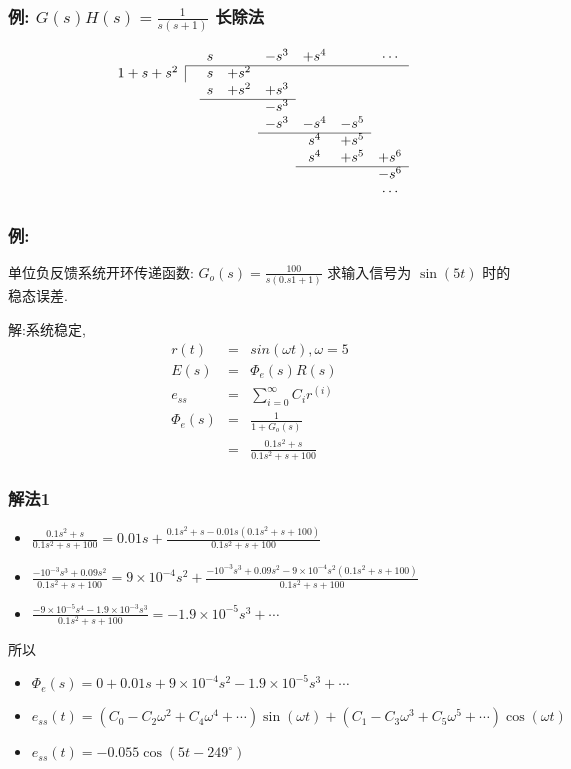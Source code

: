 \documentclass{beamer}
\begin{document}
\begin{frame}
\frametitle{例: $G(s)H(s)=\frac{1}{s(s+1)}$ 长除法}
\label{sec-3-7}

\[ 
\begin{array}{ccccccccc} 
 & & s &  & -s^3 & +s^4 &  &\cdots\\
\cline{2-8}
\multicolumn{1}{r|}{1+s+s^2} & & s & +s^2 \\
                             & & s  & +s^2 & +s^3 \\
\cline{3-5}
                             & &   &     & -s^3 \\
                             & &   &     & -s^3  & -s^4 & -s^5\\
\cline{5-7}
                             & &   &     &       &  s^4 &  +s^5\\
                             & &   &     &       &  s^4 &  +s^5  & +s^6\\
\cline{6-8}
                             & &   &     &       &      &       & -s^6\\
                             & &   &     &       &      &       & \cdots
\end{array} 
\]
\end{frame}
\begin{frame}
\frametitle{例:}
\label{sec-3-8}

单位负反馈系统开环传递函数: $G_o(s)=\frac{100}{s(0.s1+1)}$ 求输入信号为 $\sin(5 t)$ 时的稳态误差.

解:系统稳定,
\begin{eqnarray*}
r(t) &=& sin(\omega t),\omega=5 \\
E(s) &=& \Phi_e(s)R(s) \\
e_{ss}&=& \sum_{i=0}^{\infty}C_i r^{(i)} \\
\Phi_e(s)&=& \frac{1}{1+G_o(s)} \\
         &=& \frac{0.1s^2+s}{0.1s^2+s+100} 
\end{eqnarray*}
\end{frame}
\begin{frame}
\frametitle{解法1}
\label{sec-3-9}





\begin{itemize}
\item $\frac{0.1s^2+s}{0.1s^2+s+100}  =0.01s+\frac{0.1s^2+s-0.01s(0.1s^2+s+100)}{0.1s^2+s+100}$
\item $\frac{-10^{-3}s^3+0.09s^2}{0.1s^2+s+100} = 9\times 10^{-4}s^2+\frac{-10^{-3}s^3+0.09s^2-9\times 10^{-4}s^2(0.1s^2+s+100)}{0.1s^2+s+100}$
\item $\frac{-9\times 10^{-5}s^4-1.9\times 10^{-3}s^3}{0.1s^2+s+100}  = -1.9\times 10^{-5}s^3 + \cdots$
\end{itemize}
所以
\begin{itemize}
\item $\Phi_e(s) = 0+0.01s+9\times 10^{-4}s^2-1.9\times 10^{-5}s^3+\cdots$
\item $e_{ss}(t) = (C_0-C_2\omega^2+C_4\omega^4+\cdots)\sin(\omega t)+(C_1-C_3\omega^3+C_5\omega^5+\cdots)\cos(\omega t)$
\item $e_{ss}(t) = -0.055\cos(5t-249^{\circ})$
\end{itemize}
\end{frame}
\end{document}
